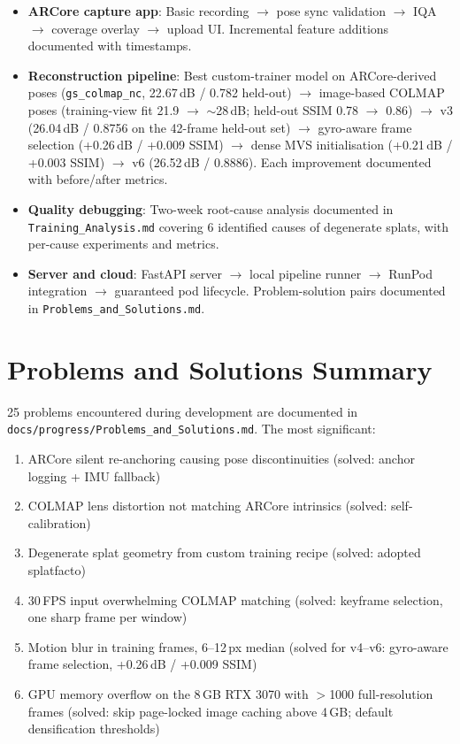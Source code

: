 \begin{itemize}
    \item \textbf{ARCore capture app}: Basic recording $\rightarrow$ pose sync validation $\rightarrow$ IQA $\rightarrow$ coverage overlay $\rightarrow$ upload UI. Incremental feature additions documented with timestamps.

    \item \textbf{Reconstruction pipeline}: Best custom-trainer model on ARCore-derived poses (\texttt{gs\_colmap\_nc}, 22.67\,dB / 0.782 held-out) $\rightarrow$ image-based COLMAP poses (training-view fit 21.9 $\rightarrow$ $\sim$28\,dB; held-out SSIM 0.78 $\rightarrow$ 0.86) $\rightarrow$ v3 (26.04\,dB / 0.8756 on the 42-frame held-out set) $\rightarrow$ gyro-aware frame selection (+0.26\,dB / +0.009 SSIM) $\rightarrow$ dense MVS initialisation (+0.21\,dB / +0.003 SSIM) $\rightarrow$ v6 (26.52\,dB / 0.8886). Each improvement documented with before/after metrics.

    \item \textbf{Quality debugging}: Two-week root-cause analysis documented in \texttt{Training\_Analysis.md} covering 6 identified causes of degenerate splats, with per-cause experiments and metrics.

    \item \textbf{Server and cloud}: FastAPI server $\rightarrow$ local pipeline runner $\rightarrow$ RunPod integration $\rightarrow$ guaranteed pod lifecycle. Problem-solution pairs documented in \texttt{Problems\_and\_Solutions.md}.
\end{itemize}

\section{Problems and Solutions Summary}

25 problems encountered during development are documented in \texttt{docs/progress/Problems\_and\_Solutions.md}. The most significant:

\begin{enumerate}
    \item ARCore silent re-anchoring causing pose discontinuities (solved: anchor logging + IMU fallback)
    \item COLMAP lens distortion not matching ARCore intrinsics (solved: self-calibration)
    \item Degenerate splat geometry from custom training recipe (solved: adopted splatfacto)
    \item 30\,FPS input overwhelming COLMAP matching (solved: keyframe selection, one sharp frame per window)
    \item Motion blur in training frames, 6--12\,px median (solved for v4--v6: gyro-aware frame selection, +0.26\,dB / +0.009 SSIM)
    \item GPU memory overflow on the 8\,GB RTX 3070 with $>$1000 full-resolution frames (solved: skip page-locked image caching above 4\,GB; default densification thresholds)
\end{enumerate}
